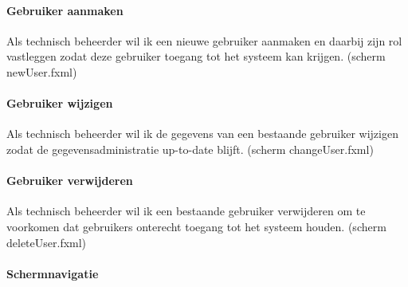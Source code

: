 \documentclass[11pt, a4paper]{article}
\begin{document}
\paragraph{Gebruiker aanmaken} Als technisch beheerder wil ik een nieuwe gebruiker aanmaken en daarbij zijn rol vastleggen zodat deze gebruiker toegang tot het systeem kan krijgen. (scherm newUser.fxml)

\paragraph{Gebruiker wijzigen} Als technisch beheerder wil ik de gegevens van een bestaande gebruiker wijzigen zodat de gegevensadministratie up-to-date blijft. (scherm changeUser.fxml)

\paragraph{Gebruiker verwijderen} Als technisch beheerder wil ik een bestaande gebruiker verwijderen om te voorkomen dat gebruikers onterecht toegang tot het systeem houden. (scherm deleteUser.fxml)

\paragraph{Schermnavigatie} 
\end{document}
